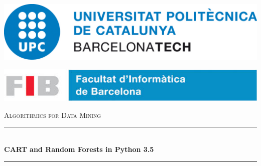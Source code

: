 \documentclass[a4paper,10pt]{article}
\begin{document}
\begin{titlepage}
  \newcommand{\HRule}{\rule{\linewidth}{0.5mm}}

  \center %

  \begin{minipage}[c]{0.4\linewidth}
    \hspace{0.12\linewidth}%
    \includegraphics[keepaspectratio, width=0.76\linewidth]{images/UPC.jpg}
  \end{minipage}%
  \hspace{0.1\linewidth}%
  \begin{minipage}[c]{0.4\linewidth}
    \includegraphics[keepaspectratio, width=\linewidth]{images/FIB.jpg}
  \end{minipage}

  \vspace{4em}

  \textsc{\LARGE Algorithmics for Data Mining}\\[0.5cm] %

  \HRule \\[0.4cm]
         { \huge \bfseries CART and Random Forests in Python 3.5}\\[0.4cm] %
         \HRule \\[7.5cm]
         

\end{titlepage}
\end{document}

